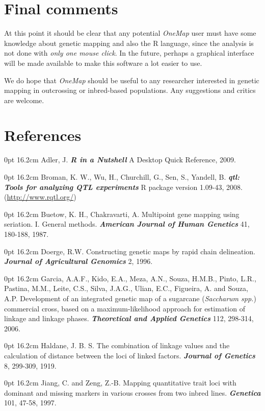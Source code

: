 \documentclass[letterpaper,12pt,oneside]{article}
\begin{document}
\section{Final comments}
At this point it should be clear that any potential {\sl OneMap} user must have some knowledge about genetic mapping and also the R language, since the analysis is not done with {\sl only one mouse click}. In the future, perhaps a graphical interface will be made available to make this software a lot easier to use. 

We do hope that {\sl OneMap} should be useful to any researcher interested in genetic mapping in outcrossing or inbred-based populations. Any suggestions and critics are welcome.


\section{References}
\setlength{\parindent}{0cm}

 0pt \linewidth 0.8cm 16.2cm
Adler, J. {\bf {\it R in a Nutshell}} A Desktop Quick Reference, 2009. 

 0pt \linewidth 0.8cm 16.2cm
Broman, K. W., Wu, H., Churchill, G., Sen, S., Yandell, B. {\bf {\it qtl: Tools for analyzing QTL experiments}} R package version 1.09-43, 2008. (\url{http://www.rqtl.org/})

 0pt \linewidth 0.8cm 16.2cm
Buetow, K. H., Chakravarti, A. Multipoint gene mapping using seriation. I. General methods. {\bf {\it American Journal of  Human Genetics}} 41, 180-188, 1987. 

 0pt \linewidth 0.8cm 16.2cm
Doerge, R.W. Constructing genetic maps by rapid chain delineation. {\bf {\it Journal of Agricultural Genomics}} 2, 1996.

 0pt \linewidth 0.8cm 16.2cm
Garcia, A.A.F., Kido, E.A., Meza, A.N., Souza, H.M.B., Pinto, L.R., Pastina, M.M., Leite, C.S., Silva, J.A.G., Ulian, E.C., Figueira, A. and Souza, A.P. Development of an integrated genetic map of a sugarcane ({\it Saccharum spp.}) commercial cross, based on a maximum-likelihood approach for estimation of linkage and linkage phases. {\bf {\it Theoretical and Applied Genetics}} 112, 298-314, 2006.

 0pt \linewidth 0.8cm 16.2cm
Haldane, J. B. S. The combination of linkage values and the calculation of distance between the loci of linked factors. {\bf {\it Journal of Genetics}} 8, 299-309, 1919.

 0pt \linewidth 0.8cm 16.2cm
Jiang, C. and Zeng, Z.-B. Mapping quantitative trait loci with dominant and missing markers in various crosses from two inbred lines. {\bf {\it Genetica}} 101, 47-58, 1997.
\end{document}
